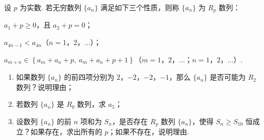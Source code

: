 \begin{problem}
设 \(p\) 为实数. 若无穷数列 \(\{a_n\}\) 满足如下三个性质，则称 \(\{a_n\}\) 为 \(R_p\) 数列：

\begin{circlelist}
\item \(a_1+p\ge0\)，且 \(a_2+p=0\)；

\item \(a_{4n-1}<a_{4n}\)（\(n=1\)，\(2\)，\(\ldots\)）；

\item \(a_{m+n}\in\left\{a_m+a_n+p,\ a_m+a_n+p+1\right\}\)（\(m=1\)，\(2\)，\(\ldots\)；\(n=1\)，\(2\)，\(\ldots\)）.
\end{circlelist}

\begin{enumerate}
    \item 如果数列 \(\{a_n\}\) 的前四项分别为 \(2\)，\(-2\)，\(-2\)，\(-1\)，那么 \(\{a_n\}\) 是否可能为 \(R_2\) 数列？说明理由；
    \item 若数列 \(\{a_n\}\) 是 \(R_0\) 数列，求 \(a_5\)；
    \item 设数列 \(\{a_n\}\) 的前 \(n\) 项和为 \(S_n\)，是否存在 \(R_p\) 数列 \(\{a_n\}\)，使得 \(S_n\ge S_{10}\) 恒成立？如果存在，求出所有的 \(p\)；如果不存在，说明理由.
\end{enumerate}
\end{problem}

